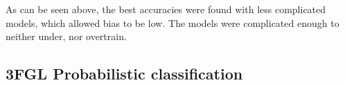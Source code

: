 As can be seen above, the best accuracies were found with less complicated models, which allowed bias to be low. The models were complicated enough to neither under, nor overtrain. \\

\subsection{3FGL Probabilistic classification} 

